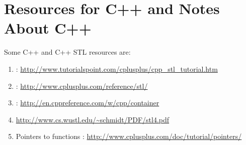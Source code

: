 \section{Resources for C++ and Notes About C++}
\label{sec:ResourcesAndNotesAboutCpp}

Some {C++} and C++ STL resources are: \vspace{-0.3cm}
\begin{enumerate} \itemsep -4pt
\item \cite{Mohtashim2015a}: \url{http://www.tutorialspoint.com/cplusplus/cpp_stl_tutorial.htm}
\item \cite{CplusplusCom2014,CplusplusCom2015,CplusplusCom2015a,CplusplusCom2015b,Soulie2007}: \url{http://www.cplusplus.com/reference/stl/}
\item \cite{cppreference2015}: \url{http://en.cppreference.com/w/cpp/container}
\item \url{http://www.cs.wustl.edu/~schmidt/PDF/stl4.pdf}
\item Pointers to functions \cite{CplusplusCom2015b}: \url{http://www.cplusplus.com/doc/tutorial/pointers/}
\end{enumerate}


